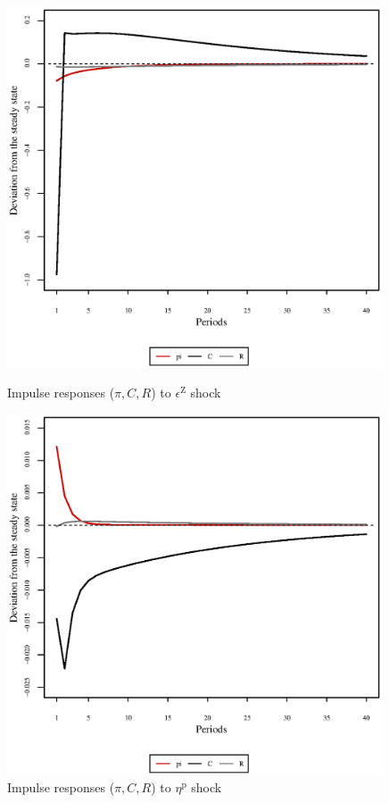 \begin{figure}[h]
\begin{minipage}{0.5\textwidth}
\vspace*{-3em}
\centering
\includegraphics[width=0.99\textwidth, scale=0.55]{plots/plot_101.eps}
\caption{Impulse responses ($\pi, C, R$) to $\epsilon^{\mathrm{Z}}$ shock}
\end{minipage}
\begin{minipage}{0.5\textwidth}
\vspace*{-3em}
\centering
\includegraphics[width=0.99\textwidth, scale=0.55]{plots/plot_102.eps}
\caption{Impulse responses ($\pi, C, R$) to $\eta^{\mathrm{p}}$ shock}
\end{minipage}
\end{figure}

